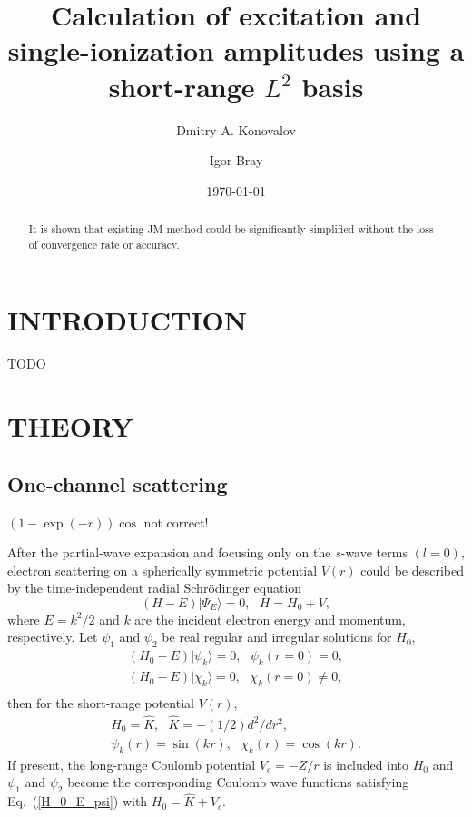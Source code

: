 \documentclass[aip
, pra
, showpacs
, aps
, twocolumn
, groupedaddress
, floatfix
]{revtex4}
\newcommand{\beq}{\begin{equation}}
\newcommand{\eeq}{\end{equation}}
\newcommand{\barr}{\begin{array}}
\newcommand{\earr}{\end{array}}
\begin{document}
\title {Calculation of excitation and single-ionization amplitudes using a short-range $L^2$ basis}

\author{Dmitry A. Konovalov}

\author{Igor Bray}


\date{\today}

\begin{abstract}
It is shown that existing JM method could be significantly simplified without the loss of convergence rate or accuracy.

\end{abstract}

\maketitle

\section{INTRODUCTION}
TODO

\section{THEORY}
\subsection{One-channel scattering}


$(1-\exp(-r))\cos$ \cite{Nesbet68} not correct!


After the partial-wave expansion \cite{Taylor72,N82} and focusing only on the $s$-wave terms $(l=0)$,
electron scattering on a spherically symmetric potential $V(r)$
could be described by the time-independent radial Schr\"odinger equation
\beq
(H-E) | \Psi_E \rangle =0,  \ \ \ H = H_0 + V, \label{H_E_Psi_E}
\eeq
where $E=k^2/2$ and $k$ are the incident electron energy and momentum, respectively.
Let $\psi_1$ and $\psi_2$ be real regular and irregular solutions for $H_0$,
\beq \barr{l}
(H_0-E) | \psi_k \rangle =0,  \ \ \ \psi_k(r=0) = 0,\\
(H_0-E) | \chi_k \rangle =0,  \ \ \ \chi_k(r=0) \neq 0,\\
\earr \label{H_0_E_psi}\eeq
then for the short-range potential $V(r)$,
\beq \barr{l}
H_0 = \hat{K},\ \ \ \hat{K} = -(1/2) d^2/dr^2,\\
\psi_k(r) = \sin(kr), \ \ \ \chi_k(r) = \cos(kr).
\earr \label{K} \eeq
If present, the long-range Coulomb potential $V_c=-Z/r$ is included into $H_0$
and $\psi_1$ and $\psi_2$ become the corresponding Coulomb wave functions satisfying Eq.~(\ref{H_0_E_psi})
with $H_0 = \hat{K} + V_c$.
\end{document}
